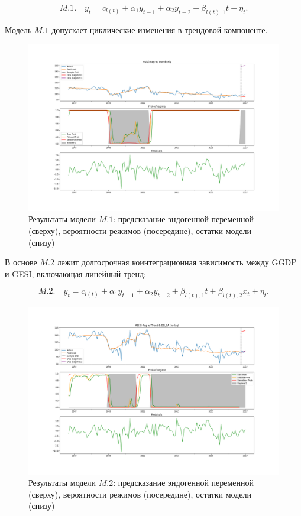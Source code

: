 \documentclass[a4paper,14pt]{extreport}
\begin{document}

\begin{equation}	
	M.1. \quad y_t = c_{l(t)} + \alpha_1 y_{t-1} + \alpha_2 y_{t-2} + \beta_{l(t), 1} t + \eta_t .
\end{equation}

Модель $M.1$ допускает циклические изменения в трендовой компоненте. 

\begin{figure}[H]
	\includegraphics[width=\linewidth]{img/manual/model_m1.png}
	\caption{Результаты модели $M.1$: предсказание эндогенной переменной (сверху), вероятности режимов (посередине), остатки модели (снизу)}
	\label{fig:sm_model_m1}
\end{figure}

В основе $M.2$ лежит долгосрочная коинтеграционная зависимость между GGDP и GESI, включающая линейный тренд:

\begin{equation}
	M.2. \quad y_t = c_{l(t)} + \alpha_1 y_{t-1} + \alpha_2 y_{t-2} + \beta_{l(t), 1} t + \beta_{l(t), 2} x_{t} + \eta_t .
\end{equation}

\begin{figure}[H]
	\includegraphics[width=\linewidth]{img/manual/model_m2.png}
	\caption{Результаты модели $M.2$: предсказание эндогенной переменной (сверху), вероятности режимов (посередине), остатки модели (снизу)}
	\label{fig:sm_model_m2}
\end{figure}
\end{document}
